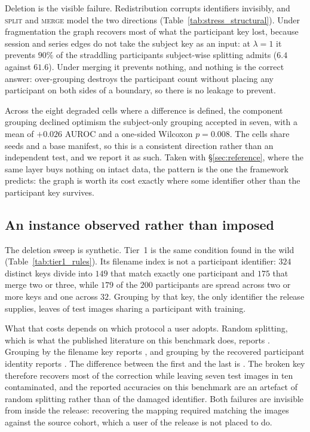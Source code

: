 \documentclass[pdflatex,sn-vancouver-num]{sn-jnl}
\begin{document}
Deletion is the visible failure. Redistribution corrupts identifiers invisibly,
and \textsc{split} and \textsc{merge} model the two directions
(Table~\ref{tab:stress_structural}). Under fragmentation the graph recovers most
of what the participant key lost, because session and series edges do not take
the subject key as an input: at $\lambda = 1$ it prevents $90\%$ of the
straddling participants subject-wise splitting admits ($6.4$ against $61.6$).
Under merging it prevents nothing, and nothing is the correct answer:
over-grouping destroys the participant count without placing any participant on
both sides of a boundary, so there is no leakage to prevent.

Across the eight degraded cells where a difference is defined, the component
grouping declined optimism the subject-only grouping accepted in seven, with a
mean of $+0.026$ AUROC and a one-sided Wilcoxon $p = 0.008$. The cells share
seeds and a base manifest, so this is a consistent direction rather than an
independent test, and we report it as such. Taken with \S\ref{sec:reference},
where the same layer buys nothing on intact data, the pattern is the one the
framework predicts: the graph is worth its cost exactly where some identifier
other than the participant key survives.

\subsection{An instance observed rather than imposed}
\label{sec:observed}

The deletion sweep is synthetic. Tier~1 is the same condition found in the wild
(Table~\ref{tab:tier1_rules}). Its filename index is not a participant
identifier: $324$ distinct keys divide into $149$ that match exactly one
participant and $175$ that merge two or three, while $179$ of the $200$
participants are spread across two or more keys and one across $32$. Grouping by
that key, the only identifier the release supplies, leaves
\TierOneShareFilename{} of test images sharing a participant with training.

What that costs depends on which protocol a user adopts. Random splitting, which
is what the published literature on this benchmark does, reports
\TierOneRandomAUROC{}. Grouping by the filename key reports
\TierOneFilenameAUROC{}, and grouping by the recovered participant identity
reports \TierOneTrueAUROC{}. The difference between the first and the last is
\TierOneGapTotal{} \TierOneGapCI{}. The broken key therefore recovers most of
the correction while leaving seven test images in ten contaminated, and the
reported accuracies on this benchmark are an artefact of random splitting rather
than of the damaged identifier. Both failures are invisible from inside the
release: recovering the mapping required matching the images against the source
cohort, which a user of the release is not placed to do.
\end{document}
